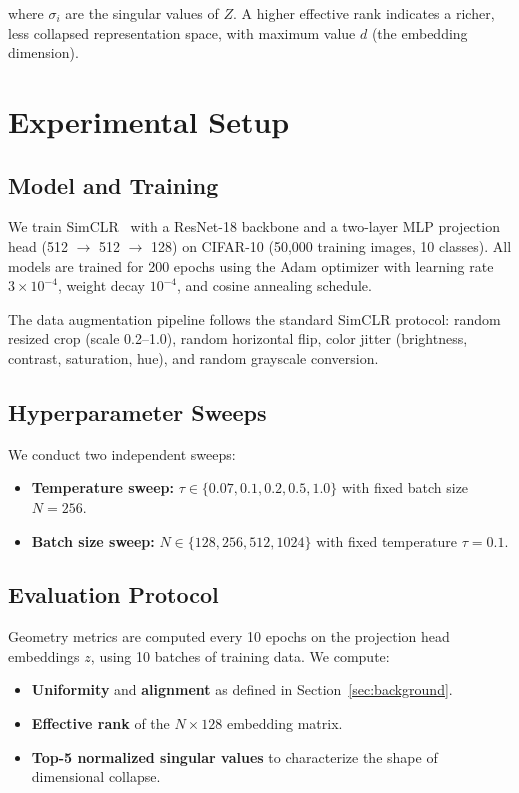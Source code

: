 \documentclass{article}
\begin{document}
where $\sigma_i$ are the singular values of $Z$. A higher effective rank 
indicates a richer, less collapsed representation space, with maximum value 
$d$ (the embedding dimension).


\section{Experimental Setup}

\subsection{Model and Training}

We train SimCLR~\cite{chen2020simple} with a ResNet-18 backbone and a 
two-layer MLP projection head (512 $\rightarrow$ 512 $\rightarrow$ 128) on 
CIFAR-10 (50,000 training images, 10 classes). All models are trained for 
200 epochs using the Adam optimizer with learning rate $3 \times 10^{-4}$, 
weight decay $10^{-4}$, and cosine annealing schedule.

The data augmentation pipeline follows the standard SimCLR protocol: random 
resized crop (scale 0.2--1.0), random horizontal flip, color jitter 
(brightness, contrast, saturation, hue), and random grayscale conversion.

\subsection{Hyperparameter Sweeps}

We conduct two independent sweeps:

\begin{itemize}
    \item \textbf{Temperature sweep:} $\tau \in \{0.07, 0.1, 0.2, 0.5, 1.0\}$ 
    with fixed batch size $N=256$.
    \item \textbf{Batch size sweep:} $N \in \{128, 256, 512, 1024\}$ with 
    fixed temperature $\tau=0.1$.
\end{itemize}

\subsection{Evaluation Protocol}

Geometry metrics are computed every 10 epochs on the projection head embeddings 
$z$, using 10 batches of training data. We compute:

\begin{itemize}
    \item \textbf{Uniformity} and \textbf{alignment} as defined in 
    Section~\ref{sec:background}.
    \item \textbf{Effective rank} of the $N \times 128$ embedding matrix.
    \item \textbf{Top-5 normalized singular values} to characterize the 
    shape of dimensional collapse.
\end{itemize}
\end{document}
